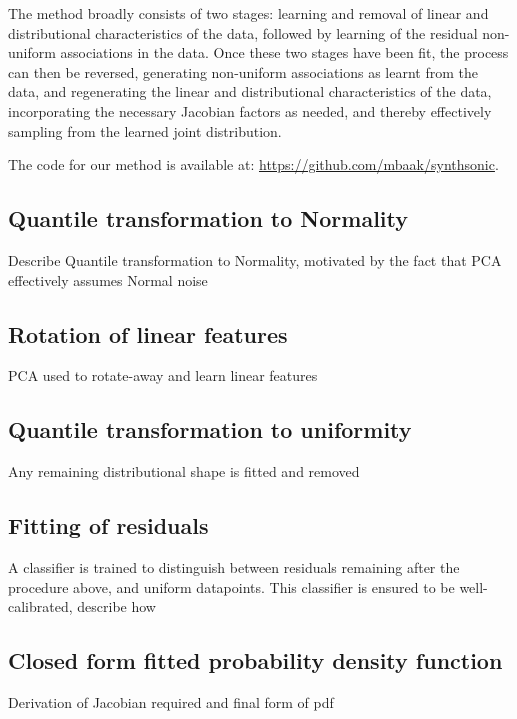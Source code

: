 \documentclass{article}
\begin{document}
The method broadly consists of two stages: learning and removal of linear and distributional characteristics of the data, followed by learning of the residual non-uniform associations in the data. Once these two stages have been fit, the process can then be reversed, generating non-uniform associations as learnt from the data, and regenerating the linear and distributional characteristics of the data, incorporating the necessary Jacobian factors as needed, and thereby effectively sampling from the learned joint distribution.

The code for our method is available at: \url{https://github.com/mbaak/synthsonic}.


\subsection{Quantile transformation to Normality}

Describe Quantile transformation to Normality, motivated by the fact that PCA effectively assumes Normal noise ~\cite{tipping1999probabilistic}

\subsection{Rotation of linear features}

PCA used to rotate-away and learn linear features

\subsection{Quantile transformation to uniformity}

Any remaining distributional shape is fitted and removed

\subsection{Fitting of residuals}

A classifier is trained to distinguish between residuals remaining after the procedure above, and uniform datapoints.
This classifier is ensured to be well-calibrated, describe how

\subsection{Closed form fitted probability density function}

Derivation of Jacobian required and final form of pdf
\end{document}
